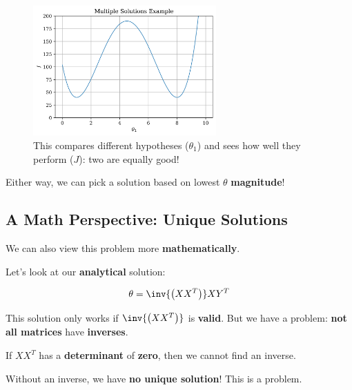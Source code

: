         \begin{figure}[H]
        \centering
            \includegraphics[width=70mm,scale=0.5]{images/regression_images/Regression_Multiple_Solutions_Example.png}
        
            \caption*{This compares different hypotheses ($\theta_1$) and sees how well they perform ($J$): two are equally good!}
        \end{figure}
        
        Either way, we can pick a solution based on lowest $\theta$ \textbf{magnitude}!
        
    \subsection*{A Math Perspective: Unique Solutions}    
        
        We can also view this problem more \textbf{mathematically}.
        
        Let's look at our \textbf{analytical} solution:
        
        \begin{equation}
            \theta = 
                \inv{  \left(  XX^T  \right)  }   X Y^T
        \end{equation}
        
        This solution only works if $\inv{  \left(  XX^T  \right)  }$ is \textbf{valid}. But we have a problem: \textbf{not all matrices} have \textbf{inverses}. 
        
        If $XX^T$ has a \textbf{determinant} of \textbf{zero}, then we cannot find an inverse. 
        
        Without an inverse, we have \textbf{no unique solution}! This is a problem.
        
